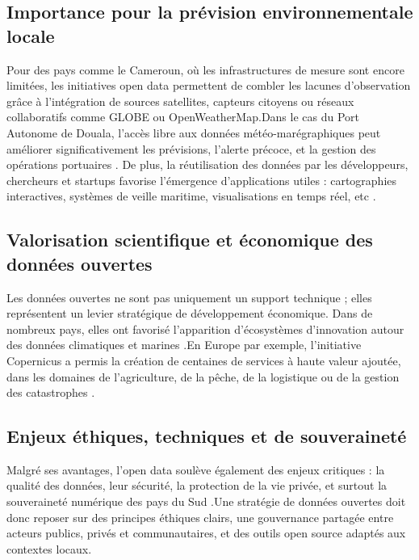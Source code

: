 \documentclass[a4paper,12pt,openany]{report}
\begin{document}
\subsection{Importance pour la prévision environnementale locale}
\quad Pour des pays comme le Cameroun, où les infrastructures de mesure sont encore limitées, les initiatives open data permettent de combler les lacunes d’observation grâce à l’intégration de sources satellites, capteurs citoyens ou réseaux collaboratifs comme GLOBE ou OpenWeatherMap\cite{UNECA2020}.Dans le cas du Port Autonome de Douala, l’accès libre aux données météo-marégraphiques peut améliorer significativement les prévisions, l’alerte précoce, et la gestion des opérations portuaires \cite{PAD2023}.
De plus, la réutilisation des données par les développeurs, chercheurs et startups favorise l’émergence d’applications utiles : cartographies interactives, systèmes de veille maritime, visualisations en temps réel, etc \cite{Morozov2019}. 

\subsection{Valorisation scientifique et économique des données ouvertes}
\quad Les données ouvertes ne sont pas uniquement un support technique ; elles représentent un levier stratégique de développement économique. Dans de nombreux pays, elles ont favorisé l’apparition d’écosystèmes d’innovation autour des données climatiques et marines\cite{Janssen2012} .En Europe par exemple, l’initiative Copernicus a permis la création de centaines de services à haute valeur ajoutée, dans les domaines de l’agriculture, de la pêche, de la logistique ou de la gestion des catastrophes\cite{EuropeanCommission2019} .
\subsection{Enjeux éthiques, techniques et de souveraineté}
\quad Malgré ses avantages, l’open data soulève également des enjeux critiques : la qualité des données, leur sécurité, la protection de la vie privée, et surtout la souveraineté numérique des pays du Sud \cite{Madianou2019}.Une stratégie de données ouvertes doit donc reposer sur des principes éthiques clairs, une gouvernance partagée entre acteurs publics, privés et communautaires, et des outils open source adaptés aux contextes locaux.

	

\newpage
\end{document}
